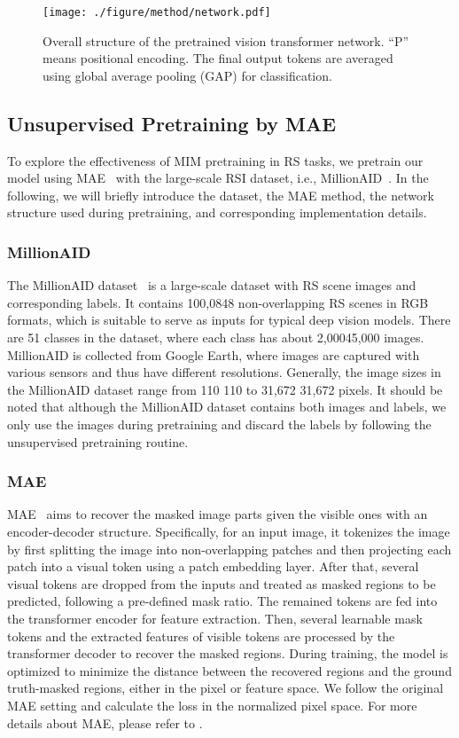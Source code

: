 \documentclass[10pt, journal,twoside]{IEEEtran}
\begin{document}
 \begin{figure*}[t]
  \centering
  \texttt{[image: ./figure/method/network.pdf]}\\
  \caption{Overall structure of the pretrained vision transformer network. ``P'' means positional encoding. The final output tokens are averaged using global average pooling (GAP) for classification. 
  }
  \label{network}
\end{figure*}

 
\subsection{Unsupervised Pretraining by MAE}
To explore the effectiveness of MIM pretraining in RS tasks, we pretrain our model using MAE~\cite{mae} with the large-scale RSI dataset, i.e., MillionAID~\cite{Long2021DiRS}. In the following, we will briefly introduce the dataset, the MAE method, the network structure used during pretraining, and corresponding implementation details.
 
\subsubsection{MillionAID}
 
The MillionAID dataset~\cite{Long2021DiRS} is a large-scale dataset with RS scene images and corresponding labels. It contains 100,0848 non-overlapping RS scenes in RGB formats, which is suitable to serve as inputs for typical deep vision models. There are 51 classes in the dataset, where each class has about 2,00045,000 images. MillionAID is collected from Google Earth, where images are captured with various sensors and thus have different resolutions. Generally, the image sizes in the MillionAID dataset range from 110  110 to 31,672  31,672 pixels. It should be noted that although the MillionAID dataset contains both images and labels, we only use the images during pretraining and discard the labels by following the unsupervised pretraining routine.  

\subsubsection{MAE}
MAE~\cite{mae} aims to recover the masked image parts given the visible ones with an encoder-decoder structure. Specifically, for an input image, it tokenizes the image by first splitting the image into non-overlapping patches and then projecting each patch into a visual token using a patch embedding layer. After that, several visual tokens are dropped from the inputs and treated as masked regions to be predicted, following a pre-defined mask ratio. The remained tokens are fed into the transformer encoder for feature extraction. Then, several learnable mask tokens and the extracted features of visible tokens are processed by the transformer decoder to recover the masked regions. During training, the model is optimized to minimize the distance between the recovered regions and the ground truth-masked regions, either in the pixel or feature space. We follow the original MAE setting and calculate the loss in the normalized pixel space. For more details about MAE, please refer to \cite{mae}.
 
\end{document}
